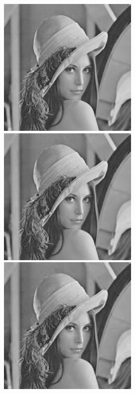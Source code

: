 		\begin{figure}[ht]
			\centering
			\begin{minipage}[c]{0.19\linewidth}
				\centering
			 	\includegraphics[trim = 20mm 30mm 40mm 30mm, clip]{lena256x256_100.jpg}
			\end{minipage}
			\begin{minipage}[c]{0.19\linewidth}
				\centering
			 	\includegraphics[trim = 20mm 30mm 40mm 30mm, clip]{lena256x256_70.jpg}
			\end{minipage}
			\begin{minipage}[c]{0.19\linewidth}
				\centering
			 	\includegraphics[trim = 20mm 30mm 40mm 30mm, clip]{lena256x256_40.jpg}

\end{minipage}
\end{figure}
